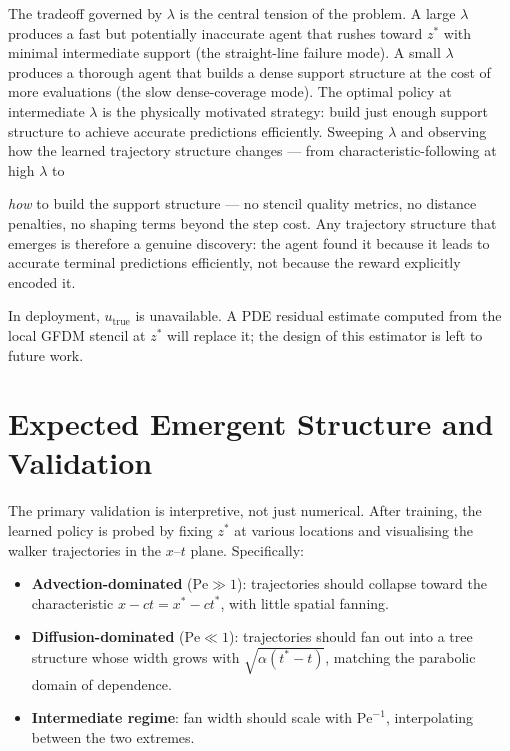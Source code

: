 \documentclass[12pt, a4paper, twoside]{report}
\theoremstyle{plain}
\theoremstyle{definition}
\begin{document}
The tradeoff governed by $\lambda$ is the central tension of the problem. A large
$\lambda$ produces a fast but potentially inaccurate agent that rushes toward $z^*$
with minimal intermediate support (the straight-line failure mode). A small $\lambda$
produces a thorough agent that builds a dense support structure at the cost of more
evaluations (the slow dense-coverage mode). The optimal policy at intermediate $\lambda$
is the physically motivated strategy: build just enough support structure to achieve
accurate predictions efficiently. Sweeping $\lambda$ and observing how the learned
trajectory structure changes --- from characteristic-following at high $\lambda$ to
 
\emph{how} to build the support structure --- no stencil quality metrics, no distance
penalties, no shaping terms beyond the step cost. Any trajectory structure that emerges
is therefore a genuine discovery: the agent found it because it leads to accurate terminal
predictions efficiently, not because the reward explicitly encoded it.
 
In deployment, $u_{\mathrm{true}}$ is unavailable. A PDE residual estimate computed
from the local GFDM stencil at $z^*$ will replace it; the design of this estimator is left
to future work.

 
\section{Expected Emergent Structure and Validation}

The primary validation is interpretive, not just numerical. After training, the learned
policy is probed by fixing $z^*$ at various locations and visualising the walker
trajectories in the $x$--$t$ plane. Specifically:

\begin{itemize}
    \item \textbf{Advection-dominated} ($\mathrm{Pe} \gg 1$): trajectories should
          collapse toward the characteristic $x - ct = x^* - ct^*$, with little spatial
          fanning.
    \item \textbf{Diffusion-dominated} ($\mathrm{Pe} \ll 1$): trajectories should fan
          out into a tree structure whose width grows with $\sqrt{\alpha(t^* - t)}$,
          matching the parabolic domain of dependence.
    \item \textbf{Intermediate regime}: fan width should scale with $\mathrm{Pe}^{-1}$,
          interpolating between the two extremes.
\end{itemize}
\end{document}

